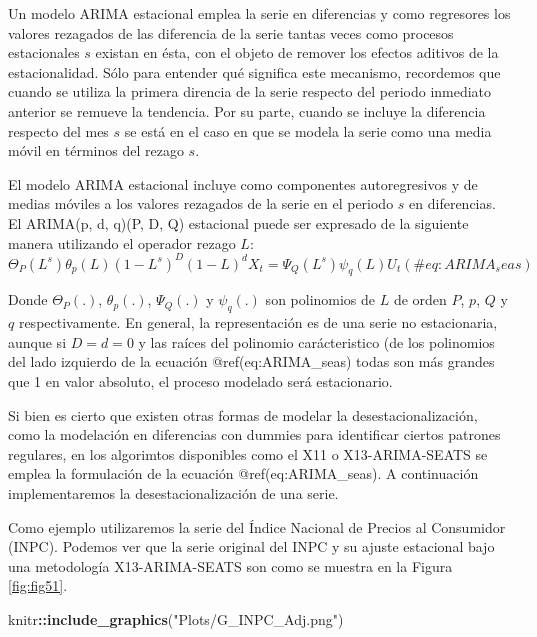 \documentclass[
]{book}
\newenvironment{Shaded}{\begin{snugshade}}{\end{snugshade}}
\newcommand{\FunctionTok}[1]{\textcolor[rgb]{0.13,0.29,0.53}{\textbf{#1}}}
\newcommand{\NormalTok}[1]{#1}
\newcommand{\SpecialCharTok}[1]{\textcolor[rgb]{0.81,0.36,0.00}{\textbf{#1}}}
\newcommand{\StringTok}[1]{\textcolor[rgb]{0.31,0.60,0.02}{#1}}
\begin{document}
Un modelo ARIMA estacional emplea la serie en diferencias y como regresores los valores rezagados de las diferencia de la serie tantas veces como procesos estacionales \(s\) existan en ésta, con el objeto de remover los efectos aditivos de la estacionalidad. Sólo para entender qué significa este mecanismo, recordemos que cuando se utiliza la primera direncia de la serie respecto del periodo inmediato anterior se remueve la tendencia. Por su parte, cuando se incluye la diferencia respecto del mes \(s\) se está en el caso en que se modela la serie como una media móvil en términos del rezago \(s\).

El modelo ARIMA estacional incluye como componentes autoregresivos y de medias móviles a los valores rezagados de la serie en el periodo \(s\) en diferencias. El ARIMA(p, d, q)(P, D, Q) estacional puede ser expresado de la siguiente manera utilizando el operador rezago \(L\):
\begin{equation}
    \Theta_P(L^s) \theta_p(L) (1 - L^s)^D (1 - L)^d X_t = \Psi_Q(L^s) \psi_q(L) U_t
    (\#eq:ARIMA_seas)
\end{equation}

Donde \(\Theta_P(.)\), \(\theta_p(.)\), \(\Psi_Q(.)\) y \(\psi_q(.)\) son polinomios de \(L\) de orden \(P\), \(p\), \(Q\) y \(q\) respectivamente. En general, la representación es de una serie no estacionaria, aunque si \(D = d = 0\) y las raíces del polinomio carácteristico (de los polinomios del lado izquierdo de la ecuación @ref(eq:ARIMA\_seas) todas son más grandes que 1 en valor absoluto, el proceso modelado será estacionario.

Si bien es cierto que existen otras formas de modelar la desestacionalización, como la modelación en diferencias con dummies para identificar ciertos patrones regulares, en los algorimtos disponibles como el X11 o X13-ARIMA-SEATS se emplea la formulación de la ecuación @ref(eq:ARIMA\_seas). A continuación implementaremos la desestacionalización de una serie.

Como ejemplo utilizaremos la serie del Índice Nacional de Precios al Consumidor (INPC). Podemos ver que la serie original del INPC y su ajuste estacional bajo una metodología X13-ARIMA-SEATS son como se muestra en la Figura \ref{fig:fig51}.

\begin{Shaded}
\begin{Highlighting}[]
\NormalTok{knitr}\SpecialCharTok{::}\FunctionTok{include\_graphics}\NormalTok{(}\StringTok{"Plots/G\_INPC\_Adj.png"}\NormalTok{) }
\end{Highlighting}
\end{Shaded}
\end{document}

